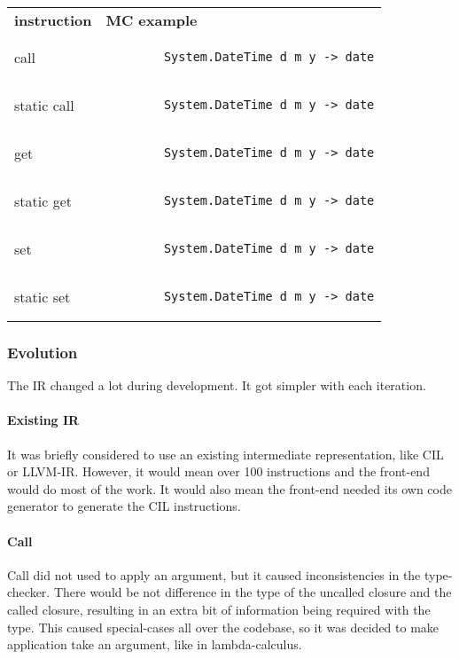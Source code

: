 \begin{tabular}{ll}
    \textbf{instruction} & \textbf{MC example}\\
    call & \begin{lstlisting}
        System.DateTime d m y -> date
    \end{lstlisting}\\
    static call & \begin{lstlisting}
        System.DateTime d m y -> date
    \end{lstlisting}\\
    get & \begin{lstlisting}
        System.DateTime d m y -> date
    \end{lstlisting}\\
    static get & \begin{lstlisting}
        System.DateTime d m y -> date
    \end{lstlisting}\\
    set & \begin{lstlisting}
        System.DateTime d m y -> date
    \end{lstlisting}\\
    static set & \begin{lstlisting}
        System.DateTime d m y -> date
    \end{lstlisting}\\
\end{tabular}

\subsubsection{Evolution}
The IR changed a lot during development.
It got simpler with each iteration.

\paragraph{Existing IR} It was briefly considered to use an existing intermediate representation, like CIL or LLVM-IR.
However, it would mean over 100 instructions and the front-end would do most of the work.
It would also mean the front-end needed its own code generator to generate the CIL instructions.

\paragraph{Call} Call did not used to apply an argument, but it caused inconsistencies in the type-checker.
There would be not difference in the type of the uncalled closure and the called closure, resulting in an extra bit of information being required with the type.
This caused special-cases all over the codebase, so it was decided to make application take an argument, like in lambda-calculus.

